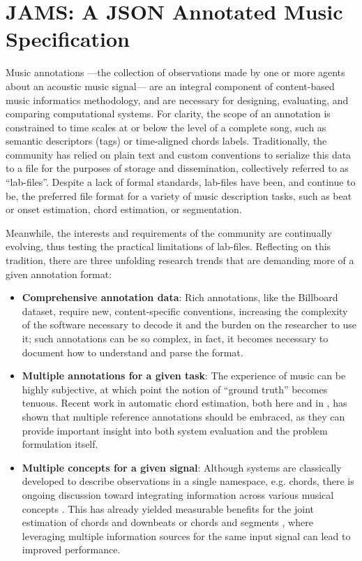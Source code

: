 \section{JAMS: A JSON Annotated Music Specification}
\label{sec:jams}

Music annotations ---the collection of observations made by one or more agents about an acoustic music signal--- are an integral component of content-based music informatics methodology, and are necessary for designing, evaluating, and comparing computational systems.
For clarity, the scope of an annotation is constrained to time scales at or below the level of a complete song, such as semantic descriptors (tags) or time-aligned chords labels.
Traditionally, the community has relied on plain text and custom conventions to serialize this data to a file for the purposes of storage and dissemination, collectively referred to as ``lab-files''.
Despite a lack of formal standards, lab-files have been, and continue to be, the preferred file format for a variety of music description tasks, such as beat or onset estimation, chord estimation, or segmentation.

Meanwhile, the interests and requirements of the community are continually evolving, thus testing the practical limitations of lab-files.
Reflecting on this tradition, there are three unfolding research trends that are demanding more of a given annotation format:

\begin{itemize}
\item \textbf{Comprehensive annotation data}:
Rich annotations, like the Billboard dataset\cite{Burgoyne2011expert}, require new, content-specific conventions, increasing the complexity of the software necessary to decode it and the burden on the researcher to use it; such annotations can be so complex, in fact, it becomes necessary to document how to understand and parse the format\cite{De2012parsing}.

\item \textbf{Multiple annotations for a given task}:
The experience of music can be highly subjective, at which point the notion of ``ground truth'' becomes tenuous.
Recent work in automatic chord estimation, both here and in \cite{ni2013understanding}, has shown that multiple reference annotations should be embraced, as they can provide important insight into both system evaluation and the problem formulation itself.

\item \textbf{Multiple concepts for a given signal}:
Although systems are classically developed to describe observations in a single namespace, e.g. chords, there is ongoing discussion toward integrating information across various musical concepts \cite{vincent2010roadmap}.
This has already yielded measurable benefits for the joint estimation of chords and downbeats \cite{papadopoulos2011joint} or chords and segments \cite{mauch2009using}, where leveraging multiple information sources for the same input signal can lead to improved performance.
\end{itemize}



